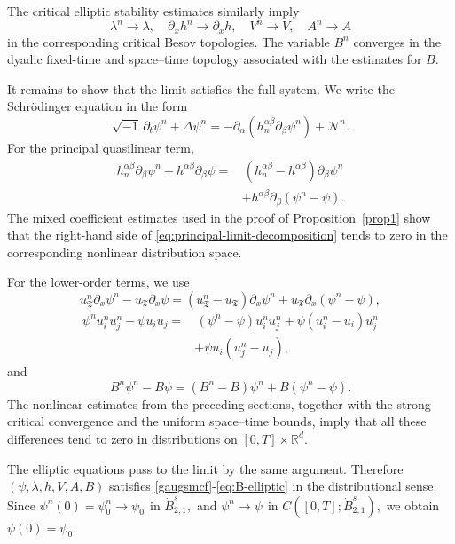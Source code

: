 \documentclass[11pt,letterpaper,reqno]{amsart}
\numberwithin{equation}{section}
\theoremstyle{definition}
\theoremstyle{remark}
\begin{document}
The critical elliptic stability estimates similarly imply
\[
\lambda^n\longrightarrow\lambda,
\quad
\partial_x h^n\longrightarrow\partial_x h,
\quad
V^n\longrightarrow V,
\quad
A^n\longrightarrow A
\]
in the corresponding critical Besov topologies. The variable \(B^n\)
converges in the dyadic fixed-time and space--time topology associated with
the estimates for \(B\).

 

It remains to show that the limit satisfies the full system. We write the
Schr\"odinger equation in the form
\[
\sqrt{-1}\,\partial_t\psi^n
+
\Delta\psi^n
=
-\partial_\alpha
\left(
h_n^{\alpha\beta}\partial_\beta\psi^n
\right)
+
\mathcal N^n.
\]
For the principal quasilinear term,
\begin{align}
h_n^{\alpha\beta}\partial_\beta\psi^n
-h^{\alpha\beta}\partial_\beta\psi
=&\,
\left(
h_n^{\alpha\beta}-h^{\alpha\beta}
\right)
\partial_\beta\psi^n
\nonumber\\
&+
h^{\alpha\beta}
\partial_\beta(\psi^n-\psi).
\label{eq:principal-limit-decomposition}
\end{align}
The mixed coefficient estimates used in the proof of
Proposition~\ref{prop1} show that the right-hand
side of \eqref{eq:principal-limit-decomposition} tends to zero in the
corresponding nonlinear distribution space.

For the lower-order terms, we use
\[
u_{\mathfrak T}^n\partial_x\psi^n
-u_{\mathfrak T}\partial_x\psi
=
(u_{\mathfrak T}^n-u_{\mathfrak T})\partial_x\psi^n
+u_{\mathfrak T}\partial_x(\psi^n-\psi),
\]
\begin{align}
\psi^n u_i^n u_j^n
-\psi u_i u_j
=&\,
(\psi^n-\psi)u_i^n u_j^n
+
\psi(u_i^n-u_i)u_j^n
\nonumber\\
&+
\psi u_i(u_j^n-u_j),
\end{align}
and
\[
B^n\psi^n-B\psi
=
(B^n-B)\psi^n
+B(\psi^n-\psi).
\]
The nonlinear estimates from the preceding sections, together with the
strong critical convergence and the uniform space--time bounds, imply that
all these differences tend to zero in distributions on \([0,T]\times
\mathbb R^d\).

The elliptic equations pass to the limit by the same argument. Therefore
\(
\left(
\psi,
\lambda,
h,
V,
A,
B
\right)
\)
satisfies
\eqref{gaugsmcf}-\eqref{eq:B-elliptic}
in the distributional sense. Since
\(
\psi^n(0)=\psi_0^n
\longrightarrow
\psi_0
~~
\text{in }\dot B^s_{2,1},
\)
and
\(
\psi^n
\longrightarrow
\psi
~~
\text{in }C([0,T];\dot B^s_{2,1}),
\)
we obtain
\(
\psi(0)=\psi_0.
\)
\end{document}
